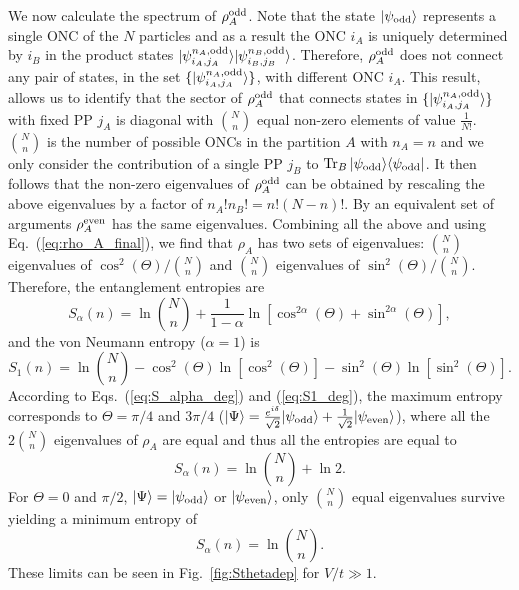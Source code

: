 We now calculate the spectrum of $\rho_A^{\rm odd}$. Note that the state $\vert
\psi_{\rm odd}\rangle$ represents a single ONC of the $N$ particles and as a
result the ONC $i_A$ is uniquely determined by $i_B$ in the product states
$\vert \psi^{n_A,\rm{odd}}_{i_A,j_A}\rangle\vert
\psi^{n_B,\rm{odd}}_{i_B,j_B}\rangle$. Therefore, $\rho_A^{\rm odd}$ does not
connect any pair of states, in the set $\{\vert
\psi^{n_A,\rm{odd}}_{i_A,j_A}\rangle\}$, with different ONC $i_A$. This result, allows us to identify that the sector
of $\rho_A^{\rm odd}$ that connects states in $\{\vert
\psi^{n_A,\rm{odd}}_{i_A,j_A}\rangle\}$ with
fixed PP $j_A$ is diagonal with $\binom{N}{n}$ equal non-zero elements of value
$\frac{1}{N!}$.  $\binom{N}{n}$ is the number of possible ONCs in the
partition $A$ with $n_A=n$ and we only consider the contribution of a single PP
$j_B$ to ${\operatorname{Tr}}_{B}\,\vert\psi_{\rm{odd}}\rangle\langle\psi_{\rm{odd}}\vert$.
It then follows that the non-zero eigenvalues of
$\rho_A^{\rm odd}$  can be obtained by rescaling the above eigenvalues by a factor
of $n_A!n_B!=n!(N-n)!$.  By an equivalent set of arguments 
$\rho_A^{\rm even}$ has the same eigenvalues. Combining all the above and using
Eq.~(\ref{eq:rho_A_final}), we find that $\rho_A$ has two sets of eigenvalues:
$\binom{N}{n}$ eigenvalues of $\cos^2(\Theta)/{\binom{N}{n}}$ and
$\binom{N}{n}$ eigenvalues of $\sin^2(\Theta)/{\binom{N}{n}}$. Therefore, 
the \ren entanglement entropies are
%
\begin{equation}
S_{\alpha}(n) = \ln
\binom{N}{n}+
\frac{1}{1-\alpha} \ln\left[\cos^{2\alpha}(\Theta)+\sin^{2\alpha}(\Theta)\right]
\label{eq:S_alpha_deg},
\end{equation}
%
and the von Neumann entropy ($\alpha = 1$) is
%
\begin{equation}
S_1(n) = \ln \binom{N}{n}-\cos^2(\Theta)
\ln\left[\cos^2(\Theta)\right]-\sin^2(\Theta)\ln\left[\sin^2(\Theta)\right].
\label{eq:S1_deg}
\end{equation}
%
According to Eqs.~(\ref{eq:S_alpha_deg}) and (\ref{eq:S1_deg}), the maximum
entropy corresponds to $\Theta=\pi/4$ and $3\pi/4$ ($\vert\Psi\rangle=
\frac{e^{i\delta}}{\sqrt{2}}\vert\psi_{\rm{odd}}\rangle+\frac{1}{\sqrt{2}}\vert\psi_{\rm{even}}\rangle$),
where all the $2\binom{N}{n}$ eigenvalues of $\rho_A$ are equal and thus all
the \ren entropies are equal to
%
\begin{equation}
S_{\alpha}(n) = \ln \binom{N}{n}+\ln2.
\label{eq:rho_A_final1}
\end{equation}
%
For $\Theta=0$ and $\pi/2$,  $\vert\Psi\rangle= \vert\psi_{\rm{odd}}\rangle$ or
$\vert\psi_{\rm{even}}\rangle$, only $\binom{N}{n}$ equal eigenvalues survive
yielding a minimum entropy of
%
\begin{equation}
S_{\alpha}(n) = \ln \binom{N}{n}.
\label{eq:rho_A_final2}
\end{equation}
These limits can be seen in Fig.~\ref{fig:Sthetadep} for $V/t \gg 1$.